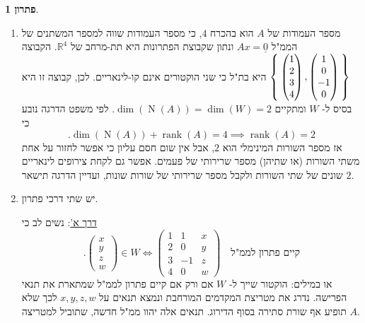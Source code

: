 \documentclass[12pt]{report}
\theoremstyle{plain}
\theoremstyle{definition}
\newtheorem*{solution}{פתרון}
\newcommand{\R}{\mathbb{R}}
\DeclareMathOperator{\rank}{rank}
\newcommand{\0}{\mathbf{0}}
\DeclareMathOperator{\Null}{N}
\begin{document}
\begin{solution}
\begin{enumerate}[label=\alph*.]
\item
מספר העמודות של
$A$
הוא בהכרח 
$4$,
כי מספר העמודות שווה למספר המשתנים של הממ"ל
$Ax=\underline{0}$
ונתון שקבוצת הפתרונות היא תת-מרחב של
$\R^4$.
הקבוצה
$\Set{\begin{pmatrix}
1 \\
2 \\
3 \\
4
\end{pmatrix},\begin{pmatrix}
1 \\
0 \\
-1 \\
0
\end{pmatrix}}$
היא בת"ל כי שני הוקטורים אינם קו-לינאריים. לכן, קבוצה זו היא בסיס ל-
$W$
ומתקיים
$\dim(\Null(A))=\dim(W)=2$.
לפי משפט הדרגה נובע כי
$$
.\dim(\Null(A))+\rank(A)=4 \implies \rank(A)=2
$$
אז מספר השורות המינימלי הוא 
$2$,
אבל אין שום חסם עליון כי אפשר לחזור על אחת משתי השורות (או שתיהן) מספר שרירותי של פעמים. אפשר גם לקחת צירופים לינאריים שונים של שתי השורות ולקבל מספר שרירותי של שורות שונות, ועדיין הדרגה תישאר 
$2$.


\item
יש שתי דרכי פתרון.

\underline{דרך א'}:
נשים לב כי
$$
.\begin{pmatrix}
x \\
y \\
z \\
w 
\end{pmatrix}\in W \iff \left(\begin{array}{cc|c}
1 & 1 & x \\
2 & 0 & y \\
3 & -1  & z \\
4 & 0 & w 
\end{array}\right) \quad \text{קיים פתרון לממ"ל}
$$
או במילים: הוקטור שייך ל-
$W$
אם ורק אם קיים פתרון לממ"ל שמתארת את תנאי הפרישה. נדרג את מטריצת המקדמים המורחבת ונמצא תנאים על 
$x,y,z,w$
לכך שלא תופיע אף שורת סתירה בסוף הדירוג. תנאים אלה יהוו ממ"ל חדשה, שתוביל למטריצה 
$A$.


\end{enumerate}
\end{solution}
\end{document}
